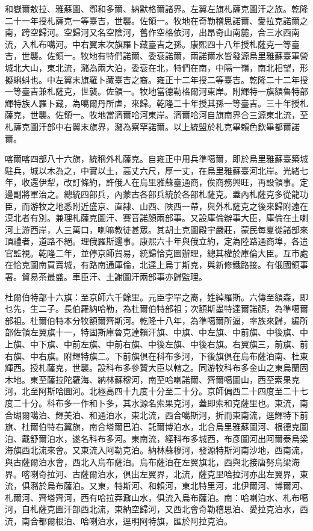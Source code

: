 \begin{pinyinscope}
和嶽爾敖拉、雅蘇圖、鄂和多爾、納默格爾諸界。左翼左旗札薩克圖汗之族。乾隆二十一年授札薩克一等臺吉，世襲。佐領一。牧地在奇勒稽思諾爾、愛拉克諾爾之南，跨空歸河。空歸河又名空陰河，舊作空格依河，出昂奇山南麓，合三水西南流，入札布噶河。中右翼末次旗羅卜藏臺吉之孫。康熙四十八年授札薩克一等臺吉，世襲。佐領一。牧地有特們諾爾、委袞諾爾，兩諾爾水皆發源烏里雅蘇臺軍營城北大山，東北流，瀦為兩大泊，委袞在北，特們在南，中隔一嶺，南北相望，形擬蝌蚪也。中左翼末旗羅卜藏臺吉之裔。雍正十二年授二等臺吉。乾隆二十二年授一等臺吉兼札薩克，世襲。佐領一。牧地當德勒格爾河東岸。附輝特一旗額魯特部輝特族人羅卜藏，為噶爾丹所虐，來歸。乾隆二十年授其孫一等臺吉。三十年授札薩克，世襲。佐領一。牧地當濟爾哈河東岸。濟爾哈河自旗南界合三源東北流，至札薩克圖汗部中右翼末旗界，瀦為察罕諾爾。以上統盟於札克畢賴色欽畢都爾諾爾。

喀爾喀四部八十六旗，統稱外札薩克。自雍正中用兵準噶爾，即於烏里雅蘇臺築城駐兵，城以木為之，中實以土，高丈六尺，厚一丈，在烏里雅蘇臺河北岸。光緒七年，收還伊犁，改訂條約，許俄人在烏里雅蘇臺通商，俟商務興旺，再設領事。定邊副將軍治之。總統四部兵，內蒙古各部兵統於各部札薩克。蓋內札薩克多從龍功臣，而游牧之地悉附近盛京、直隸、山西、陜西一帶，與外札薩克之後來歸附遠在漠北者有別。兼理札薩克圖汗、賽音諾顏兩部事。又設庫倫辦事大臣，庫倫在土喇河上游西岸，人三萬口，喇嘛教徒甚眾。其胡土克圖殿宇嚴莊，蒙民每夏從諸部來頂禮者，道路不絕。理俄羅斯邊事。康熙六十年與俄立約，定為陸路通商埠，各遣官監視。乾隆二年，並停京師貿易，統歸恰克圖辦理，總其權於庫倫大臣。互市處在恰克圖南買賣城，有路南通庫倫，北達上烏丁斯克，與新修鐵路接。有俄國領事署。貿易茶最盛。車臣汗、土謝圖汗兩部事亦歸監理。

杜爾伯特部十六旗：至京師六千餘里。元臣孛罕之裔，姓綽羅斯。六傳至額森，即乜先，生二子。長伯羅納哈勒，為杜爾伯特部祖；次額斯墨特達爾諾顏，為準噶爾部祖。杜爾伯特本分牧額爾齊斯河。乾隆十八年，為準噶爾所逼，率族來歸，編所部佐領左翼旗十一，特固斯庫魯克達賴汗旗、中旗、中左旗、中前旗、中後旗、中上旗、中下旗、中前左旗、中前右旗、中後左旗、中後右旗。右翼旗三，前旗、前右旗、中右旗。附輝特旗二。下前旗俱在科布多河，下後旗俱在烏布薩泊南、杜東輝西。授札薩克，世襲。設科布多參贊大臣以轄之。同游牧科布多金山之東烏蘭固木地。東至薩拉陀羅海、納林蘇穆河，南至哈喇諾爾、齊爾噶圖山，西至索果克河，北至阿斯哈圖河。北極高四十九度十分至二十分。京師偏西二十四度至二十七度二十分。科布多一作和卜多，其水源名索果克河，蓋即索和克薩里也。東流，南合瑚爾噶泊、輝美泊、和通泊水，東北流，西合噶斯河，折而東南流，逕輝特下前旗、杜爾伯特右翼旗，南合塔爾巴泊、託爾博泊水，北合烏里雅蘇圖河、根德克圖泊、戴舒爾泊水，遂名科布多河。東南流，經科布多城西，布彥圖河出阿爾泰烏梁海旗西北流來會。又東流入阿勒克泊。納林蘇穆河，發源特斯河南沙地，西南流，與古薩爾泊水會，西北入烏布薩泊。烏布薩泊在左翼旗北，西與北接唐努烏梁海界。喀喇奇拉河、古薩爾泊水，俱出左翼界，北流，薩克里哈拉河亦出左翼界，東流，俱瀦於烏布薩泊。又東，特斯河、和賴河，東北特里河，北伊爾河、博爾河、札爾河、齊塔齊河，西有哈拉莽鼐山水，俱流入烏布薩泊。南：哈喇泊水、札布噶河，自札薩克圖汗部西北流，東納空歸河，又西北會奇勒稽思泊、愛拉克泊水，西流，南合都爾根泊、哈喇泊水，逕明阿特旗，匯於阿拉克泊。


\end{pinyinscope}
